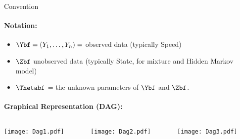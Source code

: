 \begin{frame}{Convention}
\paragraph{Notation:}
{\small
\begin{itemize}
\item $\Ybf = (Y_1, \ldots, Y_n) = $ observed data (typically Speed)
 \item $\Zbf $ unobserved data (typically State, for mixture  and Hidden Markov model)
 \item $\Thetabf$ = the unknown parameters of $\Ybf$ and $\Zbf$.
\end{itemize}
}
\paragraph{Graphical Representation (DAG):} 
\begin{columns}
\begin{column}{0.3\textwidth}
\smallskip
\texttt{[image: Dag1.pdf]}
\end{column}
\begin{column}{0.3\textwidth}
\texttt{[image: Dag2.pdf]}
\end{column}
\begin{column}{0.3\textwidth}
\texttt{[image: Dag3.pdf]}
\end{column}
\end{columns}
\end{frame}

